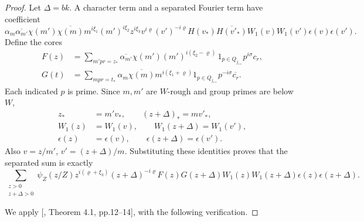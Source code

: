 \documentclass[11pt]{article}
\theoremstyle{definition}
\theoremstyle{definition}
\begin{document}
\begin{proof}
Let \(\Delta=bk\). A character term and a separated Fourier term have coefficient
\begin{equation*}
\alpha_m\overline{\alpha_{m'}}\chi(m')\overline{\chi(m)}
 m^{i\xi_1}(m')^{i\xi_2}z^{i\xi_3}v^{i\varrho}(v')^{-i\varrho}
 H(v_*)\overline{H(v'_*)}W_1(v)W_1(v')\epsilon(v)\epsilon(v').
\end{equation*}
Define the cores
{\small
{}
\begin{equation}
\begin{split}
 F(z)&=\sum_{m'pr=z_*}\overline{\alpha_{m'}}\chi(m')
 (m')^{i(\xi_2-\varrho)}\,1_{p\in Q_{j_{**}}}p^{i\sigma}c_r,\\
 G(t)&=\sum_{mpr=t_*}\alpha_m\overline{\chi(m)}
 m^{i(\xi_1+\varrho)}1_{p\in Q_{j_{**}}}p^{-i\sigma}\overline{c_r}.
 \end{split}                                           \tag{4.16}\label{eq:4-16}
\end{equation}
}
Each indicated \(p\) is prime. Since \(m,m'\) are \(W\)-rough and group primes are below \(W\),
\begin{equation*}
\begin{aligned}
z_*&=m'v_*,\qquad(z+\Delta)_*=mv'_*,\\
 W_1(z)&=W_1(v),\qquad W_1(z+\Delta)=W_1(v'),\\
 \epsilon(z)&=\epsilon(v),\qquad\epsilon(z+\Delta)=\epsilon(v').
\end{aligned}
\end{equation*}
Also \(v=z/m'\), \(v'=(z+\Delta)/m\). Substituting these identities proves that the separated sum is exactly
\begin{equation}
\sum_{\substack{z>0\\z+\Delta>0}}\psi_Z(z/Z)
 z^{i(\varrho+\xi_3)}(z+\Delta)^{-i\varrho}
 F(z)G(z+\Delta)W_1(z)W_1(z+\Delta)
                       \epsilon(z)\epsilon(z+\Delta).   \tag{4.17}\label{eq:4-17}
\end{equation}

We apply [, Theorem 4.1, pp.12--14], with the following verification.


\end{proof}
\end{document}
